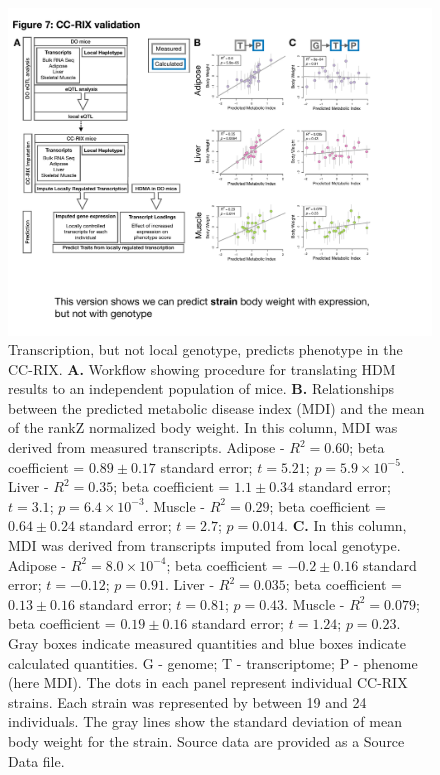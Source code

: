\documentclass[
]{article}
\begin{document}
\begin{figure}[ht!]
\includegraphics[width=\textwidth]{Figures/Fig7_CC_Prediction.pdf} 
\caption{Transcription, but not local genotype, predicts 
phenotype in the CC-RIX. \textbf{A.} Workflow showing 
procedure for translating HDM results to an independent 
population of mice. \textbf{B.} Relationships between the 
predicted metabolic disease index (MDI) and the mean
of the rankZ normalized body weight. In this column,
MDI was derived from measured transcripts. Adipose - 
$R^2 = 0.60$;  beta coefficient = $0.89\pm0.17$ 
standard error; $t = 5.21$; $p = 5.9\times10^{-5}$.
Liver - $R^2 = 0.35$;  beta coefficient = $1.1\pm0.34$ 
standard error; $t = 3.1$; $p = 6.4\times10^{-3}$.
Muscle - $R^2 = 0.29$;  beta coefficient = $0.64\pm0.24$ 
standard error; $t = 2.7$; $p = 0.014$.
\textbf{C.} In this column, MDI was derived from 
transcripts imputed from local genotype. Adipose - 
$R^2 = 8.0\times10^{-4}$;  beta coefficient = $-0.2\pm0.16$ 
standard error; $t = -0.12$; $p = 0.91$.
Liver - $R^2 = 0.035$;  beta coefficient = $0.13\pm0.16$ 
standard error; $t = 0.81$; $p = 0.43$.
Muscle - $R^2 = 0.079$;  beta coefficient = $0.19\pm0.16$ 
standard error; $t = 1.24$; $p = 0.23$.
Gray boxes indicate measured quantities and blue boxes 
indicate calculated quantities. G - genome; T - transcriptome; 
P - phenome (here MDI). The dots in each panel represent 
individual CC-RIX strains. Each strain was represented 
by between 19 and 24 individuals. The gray lines show 
the standard deviation of mean body weight for the 
strain. Source data are provided as a Source Data 
file.
}
\label{fig:cc_prediction}
\end{figure}
\end{document}
